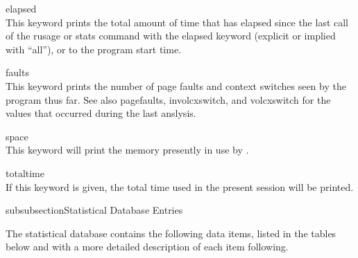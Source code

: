 \begin{description}
\item{\vt elapsed}\\
This keyword prints the total amount of time that has elapsed since
the last call of the {\cb rusage} or {\cb stats} command with the {\vt
elapsed} keyword (explicit or implied with ``{\vt all}''), or to the
program start time.

\item{\vt faults}\\
This keyword prints the number of page faults and context switches
seen by the program thus far.  See also {\et pagefaults}, {\et
involcxswitch}, and {\et volcxswitch} for the values that occurred
during the last anslysis.

\item{\vt space}\\
This keyword will print the memory presently in use by {\WRspice}.

\item{\vt totaltime}\\
If this keyword is given, the total time used in the present session
will be printed.
\end{description}

subsubsection{Statistical Database Entries}

The statistical database contains the following data items, listed in
the tables below and with a more detailed description of each item
following.

